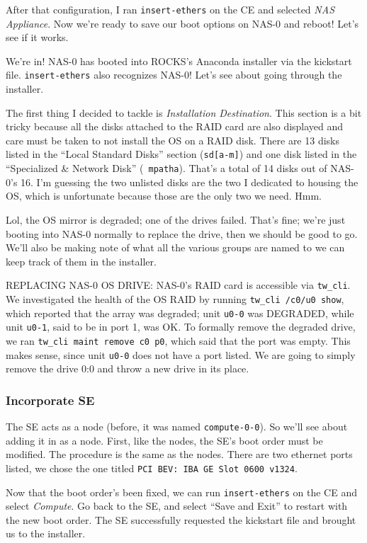 \documentclass[12pt]{article}
\begin{document}
\qq After that configuration, I ran {\tt insert-ethers} on the CE and selected
\textit{NAS Appliance}. Now we're ready to save our boot options on NAS-0 and
reboot! Let's see if it works.

\qq We're in! NAS-0 has booted into ROCKS's Anaconda installer via the kickstart
file. {\tt insert-ethers} also recognizes NAS-0! Let's see about going through
the installer.

\qq The first thing I decided to tackle is \textit{Installation
  Destination}. This section is a bit tricky because all the disks attached to
the RAID card are also displayed and care must be taken to not install the OS on
a RAID disk. There are 13 disks listed in the ``Local Standard Disks'' section
({\tt sd[a-m]}) and one disk listed in the ``Specialized \& Network Disk'' ({\tt
  mpatha}). That's a total of 14 disks out of NAS-0's 16. I'm guessing the two
unlisted disks are the two I dedicated to housing the OS, which is unfortunate
because those are the only two we need. Hmm.

\qq Lol, the OS mirror is degraded; one of the drives failed. That's fine; we're
just booting into NAS-0 normally to replace the drive, then we should be good to
go. We'll also be making note of what all the various groups are named to we can
keep track of them in the installer.

\qq REPLACING NAS-0 OS DRIVE: NAS-0's RAID card is accessible via {\tt tw\_cli}. 
We investigated the health of the OS RAID by running {\tt tw\_cli /c0/u0 show},
which reported that the array was degraded; unit {\tt u0-0} was DEGRADED, while
unit {\tt u0-1}, said to be in port 1, was OK. To formally remove the degraded
drive, we ran {\tt tw\_cli maint remove c0 p0}, which said that the port was
empty. This makes sense, since unit {\tt u0-0} does not have a port listed. We
are going to simply remove the drive 0:0 and throw a new drive in its place.

\subsubsection{Incorporate SE}

\qq The SE acts as a node (before, it was named {\tt compute-0-0}). So we'll see
about adding it in as a node. First, like the nodes, the SE's boot order must be
modified. The procedure is the same as the nodes. There are two ethernet ports
listed, we chose the one titled {\tt PCI BEV: IBA GE Slot 0600 v1324}. 

\qq Now that the boot order's been fixed, we can run {\tt insert-ethers} on the
CE and select \textit{Compute}. Go back to the SE, and select ``Save and Exit''
to restart with the new boot order. The SE successfully requested the kickstart
file and brought us to the installer.
\end{document}
